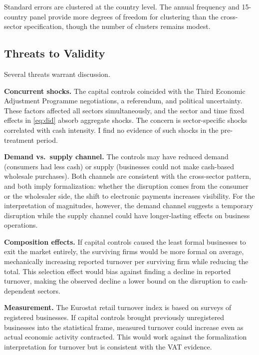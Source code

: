 \documentclass[12pt]{article}
\begin{document}
Standard errors are clustered at the country level. The annual frequency and 15-country panel provide more degrees of freedom for clustering than the cross-sector specification, though the number of clusters remains modest.

\subsection{Threats to Validity}

Several threats warrant discussion.

\textbf{Concurrent shocks.} The capital controls coincided with the Third Economic Adjustment Programme negotiations, a referendum, and political uncertainty. These factors affected all sectors simultaneously, and the sector and time fixed effects in \eqref{eq:did} absorb aggregate shocks. The concern is sector-specific shocks correlated with cash intensity. I find no evidence of such shocks in the pre-treatment period.

\textbf{Demand vs.\ supply channel.} The controls may have reduced demand (consumers had less cash) or supply (businesses could not make cash-based wholesale purchases). Both channels are consistent with the cross-sector pattern, and both imply formalization: whether the disruption comes from the consumer or the wholesaler side, the shift to electronic payments increases visibility. For the interpretation of magnitudes, however, the demand channel suggests a temporary disruption while the supply channel could have longer-lasting effects on business operations.

\textbf{Composition effects.} If capital controls caused the least formal businesses to exit the market entirely, the surviving firms would be more formal on average, mechanically increasing reported turnover per surviving firm while reducing the total. This selection effect would bias against finding a decline in reported turnover, making the observed decline a lower bound on the disruption to cash-dependent sectors.

\textbf{Measurement.} The Eurostat retail turnover index is based on surveys of registered businesses. If capital controls brought previously unregistered businesses into the statistical frame, measured turnover could increase even as actual economic activity contracted. This would work against the formalization interpretation for turnover but is consistent with the VAT evidence.


\end{document}
